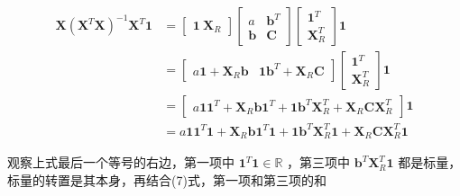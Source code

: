 \documentclass[UTF8]{ctexart}
\begin{document}
    \begin{equation}
    	\begin{aligned}
    		\boldsymbol{X} (\boldsymbol{X}^T \boldsymbol{X})^{-1} \boldsymbol{X}^T \boldsymbol{1} & = \begin{bmatrix}
    			\boldsymbol{1} \  \boldsymbol{X}_R 
    		\end{bmatrix} \begin{bmatrix}
    		    a & \boldsymbol{b}^T \\
    		    \boldsymbol{b} & \boldsymbol{C}
    	    \end{bmatrix} \begin{bmatrix}
    	        \boldsymbol{1}^T \\
    	        \boldsymbol{X}_R^T
            \end{bmatrix} \boldsymbol{1} \\
            & = \begin{bmatrix}
                a \boldsymbol{1} + \boldsymbol{X}_R \boldsymbol{b} &  \boldsymbol{1} \boldsymbol{b}^T + \boldsymbol{X}_R \boldsymbol{C}
            \end{bmatrix} \begin{bmatrix}
                \boldsymbol{1}^T \\
                \boldsymbol{X}_R^T
            \end{bmatrix} \boldsymbol{1} \\
            & = \begin{bmatrix}
            	a \boldsymbol{1} \boldsymbol{1}^T + \boldsymbol{X}_R \boldsymbol{b} \boldsymbol{1}^T + \boldsymbol{1} \boldsymbol{b}^T \boldsymbol{X}_R^T + \boldsymbol{X}_R \boldsymbol{C} \boldsymbol{X}_R^T
            \end{bmatrix} \boldsymbol{1} \\
            & = a \boldsymbol{1} \boldsymbol{1}^T \boldsymbol{1} + \boldsymbol{X}_R \boldsymbol{b} \boldsymbol{1}^T \boldsymbol{1} + \boldsymbol{1} \boldsymbol{b}^T \boldsymbol{X}_R^T \boldsymbol{1} + \boldsymbol{X}_R \boldsymbol{C} \boldsymbol{X}_R^T \boldsymbol{1}
    	\end{aligned}
    \end{equation}
    
    观察上式最后一个等号的右边，第一项中 $ \boldsymbol{1}^T \boldsymbol{1} \in \mathbb{R} $ ，第三项中 $ \boldsymbol{b}^T \boldsymbol{X}_R^T \boldsymbol{1} $ 都是标量，标量的转置是其本身，再结合(7)式，第一项和第三项的和
    
\end{document}
